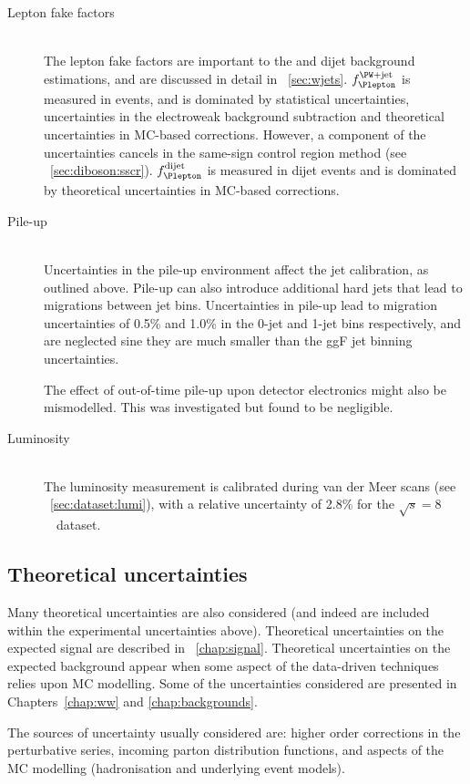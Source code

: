 \begin{description}
\item[Lepton fake factors] \hfill \\
	The lepton fake factors are important to the \Wjets and dijet background estimations, 
	and are discussed in detail in \Section~\ref{sec:wjets}. $f_{\Plepton}^{\text{\Wjets}}$ 
	is measured in \Zjets events, and is dominated by statistical uncertainties, 
	uncertainties in the electroweak background subtraction and theoretical uncertainties in 
	MC-based corrections. However, a component of the uncertainties cancels in the same-sign 
	control region method (see \Section~\ref{sec:diboson:sscr}). 
	$f_{\Plepton}^{\text{dijet}}$ is measured in dijet events and is dominated by 
	theoretical uncertainties in MC-based corrections.

\item[Pile-up] \hfill \\
	Uncertainties in the pile-up environment affect the jet calibration, as outlined above. 
	Pile-up can also introduce additional hard jets that lead to migrations between jet bins.
	Uncertainties in pile-up lead to migration uncertainties of 0.5\% and 1.0\% in the 0-jet 
	and 1-jet bins respectively, and are neglected sine they are much smaller than the ggF 
	jet binning uncertainties.

	The effect of out-of-time pile-up upon detector electronics might also be mismodelled. 
	This was investigated but found to be negligible.

\item[Luminosity] \hfill \\
	The luminosity measurement is calibrated during van der Meer scans (see 
	\Section~\ref{sec:dataset:lumi}), with a relative uncertainty of 2.8\% for the 
	\unit{$\sqrt{s} = 8$}{\TeV} dataset.

\end{description}



\subsection{Theoretical uncertainties}
\label{sec:syst:theor}

Many theoretical uncertainties are also considered (and indeed are included within the 
experimental uncertainties above). Theoretical uncertainties on the expected signal are 
described in \Chapter~\ref{chap:signal}. Theoretical uncertainties on the expected 
background appear when some aspect of the data-driven techniques relies upon MC modelling. 
Some of the uncertainties considered are presented in Chapters~\ref{chap:ww} and 
\ref{chap:backgrounds}.

The sources of uncertainty usually considered are: higher order corrections in the 
perturbative series, incoming parton distribution functions, and aspects of the MC modelling 
(\eg hadronisation and underlying event models).

